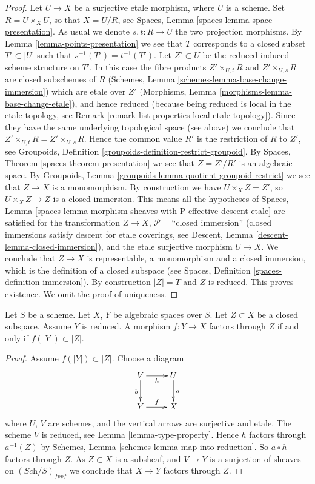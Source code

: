 \begin{proof}
Let $U \to X$ be a surjective etale morphism, where $U$ is a scheme.
Set $R = U \times_X U$, so that $X = U/R$, see
Spaces, Lemma \ref{spaces-lemma-space-presentation}.
As usual we denote $s, t : R \to U$ the two projection morphisms.
By Lemma \ref{lemma-points-presentation}
we see that $T$ corresponds to a closed subset $T' \subset |U|$ such
that $s^{-1}(T') = t^{-1}(T')$.
Let $Z' \subset U$ be the reduced induced scheme structure on $T'$.
In this case the fibre products
$Z' \times_{U, t} R$ and $Z' \times_{U, s} R$ are closed subschemes
of $R$
(Schemes, Lemma \ref{schemes-lemma-base-change-immersion})
which are etale over $Z'$
(Morphisms, Lemma \ref{morphisms-lemma-base-change-etale}),
and hence reduced
(because being reduced is local in the etale topology, see
Remark \ref{remark-list-properties-local-etale-topology}).
Since they have the same underlying topological space (see above)
we conclude that $Z' \times_{U, t} R = Z' \times_{U, s} R$.
Hence the common value $R'$ is the restriction of $R$ to $Z'$, see
Groupoids, Definition \ref{groupoids-definition-restrict-groupoid}. By
Spaces, Theorem \ref{spaces-theorem-presentation} we see that
$Z = Z'/R'$ is an algebraic space. By
Groupoids, Lemma \ref{groupoids-lemma-quotient-groupoid-restrict}
we see that $Z \to X$ is a monomorphism. By construction we have
$U \times_X Z = Z'$, so $U \times_X Z \to Z$ is a closed immersion.
This means all the hypotheses of
Spaces,
Lemma \ref{spaces-lemma-morphism-sheaves-with-P-effective-descent-etale}
are satisfied
for the transformation $Z \to X$, $\mathcal{P}=$``closed immersion'' (closed
immersions satisfy descent for etale coverings, see
Descent, Lemma \ref{descent-lemma-closed-immersion}),
and the etale surjective morphism $U \to X$. We conclude that $Z \to X$
is representable, a monomorphism and a closed immersion, which is the
definition of a closed subspace (see
Spaces, Definition \ref{spaces-definition-immersion}). By construction
$|Z| = T$ and $Z$ is reduced. This proves existence. We omit the proof
of uniqueness.
\end{proof}

\begin{lemma}
\label{lemma-map-into-reduction}
Let $S$ be a scheme.
Let $X$, $Y$ be algebraic spaces over $S$.
Let $Z \subset X$ be a closed subspace.
Assume $Y$ is reduced.
A morphism $f : Y \to X$ factors through $Z$ if and only if
$f(|Y|) \subset |Z|$.
\end{lemma}

\begin{proof}
Assume $f(|Y|) \subset |Z|$. Choose a diagram
$$
\xymatrix{
V \ar[d]_b \ar[r]_h & U \ar[d]^a \\
Y \ar[r]^f & X
}
$$
where $U$, $V$ are schemes, and the vertical arrows are surjective and
etale. The scheme $V$ is reduced, see
Lemma \ref{lemma-type-property}.
Hence $h$ factors through $a^{-1}(Z)$ by
Schemes, Lemma \ref{schemes-lemma-map-into-reduction}.
So $a \circ h$ factors through $Z$.
As $Z \subset X$ is a subsheaf, and $V \to Y$ is a surjection of sheaves
on $(\textit{Sch}/S)_{fppf}$ we conclude that $X \to Y$ factors
through $Z$.
\end{proof}

